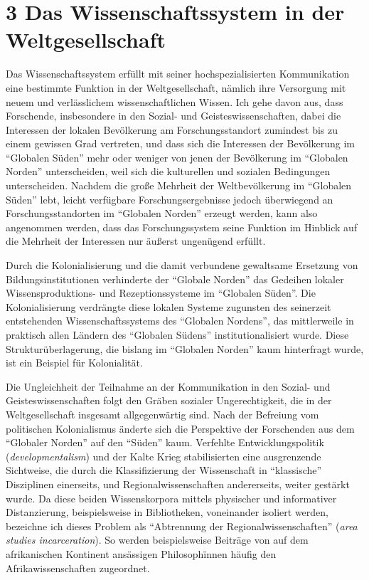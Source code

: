 \documentclass[a4paper,
fontsize=11pt,
oneside,
numbers=noperiodatend,
parskip=half-,
bibliography=totoc,
final
]{scrartcl}
\begin{document}
\hypertarget{weltges}{%
\section{3 Das Wissenschaftssystem in der
Weltgesellschaft}\label{weltges}}

Das Wissenschaftssystem erfüllt mit seiner hochspezialisierten
Kommunikation eine bestimmte Funktion in der Weltgesellschaft, nämlich
ihre Versorgung mit neuem und verlässlichem wissenschaftlichen Wissen.
Ich gehe davon aus, dass Forschende, insbesondere in den Sozial- und
Geisteswissenschaften, dabei die Interessen der lokalen Bevölkerung am
Forschungsstandort zumindest bis zu einem gewissen Grad vertreten, und
dass sich die Interessen der Bevölkerung im \enquote{Globalen Süden}
mehr oder weniger von jenen der Bevölkerung im \enquote{Globalen Norden}
unterscheiden, weil sich die kulturellen und sozialen Bedingungen
unterscheiden. Nachdem die große Mehrheit der Weltbevölkerung im
\enquote{Globalen Süden} lebt, leicht verfügbare Forschungsergebnisse
jedoch überwiegend an Forschungsstandorten im \enquote{Globalen Norden}
erzeugt werden, kann also angenommen werden, dass das Forschungssystem
seine Funktion im Hinblick auf die Mehrheit der Interessen nur äußerst
ungenügend erfüllt.

Durch die Kolonialisierung und die damit verbundene gewaltsame Ersetzung
von Bildungsinstitutionen verhinderte der \enquote{Globale Norden} das
Gedeihen lokaler Wissensproduktions- und Rezeptionssysteme im
\enquote{Globalen Süden}. Die Kolonialisierung verdrängte diese lokalen
Systeme zugunsten des seinerzeit entstehenden Wissenschaftssystems des
\enquote{Globalen Nordens}, das mittlerweile in praktisch allen Ländern
des \enquote{Globalen Südens} institutionalisiert wurde. Diese
Strukturüberlagerung, die bislang im \enquote{Globalen Norden} kaum
hinterfragt wurde, ist ein Beispiel für Kolonialität.

Die Ungleichheit der Teilnahme an der Kommunikation in den Sozial- und
Geisteswissenschaften folgt den Gräben sozialer Ungerechtigkeit, die in
der Weltgesellschaft insgesamt allgegenwärtig sind. Nach der Befreiung
vom politischen Kolonialismus änderte sich die Perspektive der
Forschenden aus dem \enquote{Globaler Norden} auf den \enquote{Süden}
kaum. Verfehlte Entwicklungspolitik (\emph{developmentalism}) und der
Kalte Krieg stabilisierten eine ausgrenzende Sichtweise, die durch die
Klassifizierung der Wissenschaft in \enquote{klassische} Disziplinen
einerseits, und Regionalwissenschaften andererseits, weiter gestärkt
wurde. Da diese beiden Wissenskorpora mittels physischer und
informativer Distanzierung, beispielsweise in Bibliotheken, voneinander
isoliert werden, bezeichne ich dieses Problem als \enquote{Abtrennung
der Regionalwissenschaften} (\emph{area studies incarceration}). So
werden beispielsweise Beiträge von auf dem afrikanischen Kontinent
ansässigen Philosophïnnen häufig den Afrikawissenschaften zugeordnet.
\end{document}

